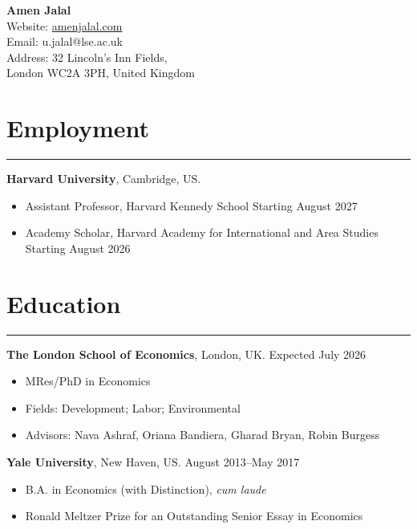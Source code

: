 \documentclass[10.5pt]{article}
\newcommand{\resumesection}[1]{\vspace{0.05cm}\section*{\large #1}\vspace{-0.2cm}\hrule\vspace{0.25cm}}
\begin{document}

\begin{center}
{\LARGE \textbf{Amen Jalal}} \\[0.5em]
Website: \href{http://amenjalal.com}{amenjalal.com} \\
Email: u.jalal@lse.ac.uk \\
Address: 32 Lincoln's Inn Fields, \\
London WC2A 3PH, United Kingdom
\end{center}


\vspace{.2cm}
\resumesection{Employment}

\textbf{Harvard University}, Cambridge, US. 
\vspace{.1cm}
\begin{itemize}
	\item Assistant Professor, Harvard Kennedy School \hfill Starting August 2027
	\item Academy Scholar, Harvard Academy for International and Area Studies \hfill Starting August 2026
\end{itemize}



\resumesection{Education}
\textbf{The London School of Economics}, London, UK. 
\vspace{.1cm}
\hfill Expected July 2026
\begin{itemize}
	\item MRes/PhD in Economics
	\item Fields: Development; Labor; Environmental
  \item Advisors: Nava Ashraf, Oriana Bandiera, Gharad Bryan, Robin Burgess
\end{itemize}

\vspace{.3cm}
\textbf{Yale University}, New Haven, US. \hfill August 2013--May 2017 
\vspace{.1cm}
\begin{itemize}
	\item B.A. in Economics (with Distinction), \emph{cum laude}
	\item Ronald Meltzer Prize for an Outstanding Senior Essay in Economics 
\end{itemize}
\end{document}
